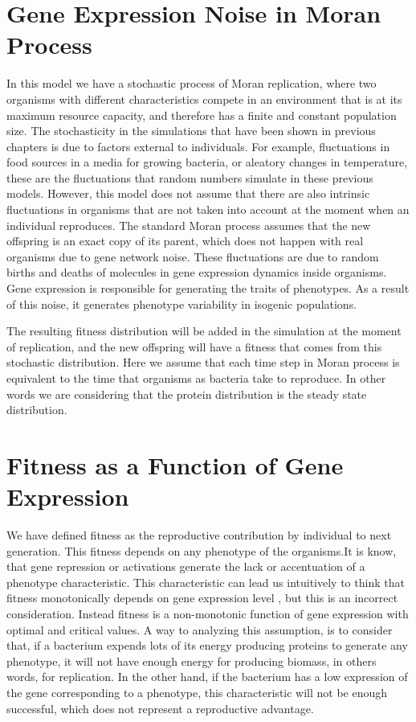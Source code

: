 \section{Gene Expression Noise in Moran Process}
In this model we have a stochastic process of Moran replication, where two organisms with different characteristics compete in an environment  that is at its maximum resource capacity, and therefore has a finite and constant population size. The stochasticity in  the simulations that have been shown in  previous chapters is due to  factors external to  individuals. For example, fluctuations in  food sources in a media  for growing bacteria, or aleatory changes in temperature, these are the fluctuations that  random numbers simulate in these previous models. However, this model  does not assume that there are  also intrinsic fluctuations in organisms  that are not taken into account at the moment when an individual reproduces. The standard Moran process assumes that the new offspring is an exact copy of its parent, which does not  happen with real organisms due to gene network noise. These fluctuations are due to random births and deaths of molecules in  gene expression dynamics inside organisms. Gene expression is responsible for generating the traits of phenotypes. As a result of this noise, it generates  phenotype variability in isogenic populations. 

The resulting fitness distribution will be added in the simulation at the moment of replication, and the new offspring will have a fitness that comes from this stochastic distribution. Here we assume that each time step in  Moran process is equivalent to the time that organisms as bacteria take to reproduce. In other words we are considering that the protein distribution is the steady state distribution.  

\section{Fitness as a Function of Gene Expression}
We have defined fitness as the reproductive contribution by individual to next generation. This fitness depends on any phenotype of the organisms.It is know, that gene repression or activations generate the lack or accentuation of a phenotype characteristic. This characteristic can lead us intuitively to think that fitness monotonically depends on gene expression level , but this is an incorrect consideration. Instead fitness is a non-monotonic function of gene expression with optimal and critical values.  A way to analyzing this  assumption, is to consider that, if a bacterium expends lots of its energy producing proteins to generate any phenotype, it will not have enough energy for producing biomass, in others words, for replication. In the other hand, if the bacterium has a low expression of the gene corresponding to a phenotype,  this characteristic will not be enough successful, which does not represent a reproductive advantage. 

